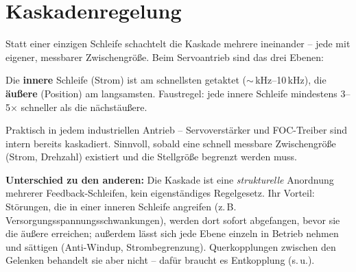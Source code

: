 \section{Kaskadenregelung}
Statt einer einzigen Schleife schachtelt die Kaskade mehrere ineinander -- jede
mit eigener, messbarer Zwischengröße. Beim Servoantrieb sind das drei Ebenen:
\begin{center}
\end{center}
Die \textbf{innere} Schleife (Strom) ist am schnellsten getaktet
($\sim$\,kHz--10\,kHz), die \textbf{äußere} (Position) am langsamsten. Faustregel:
jede innere Schleife mindestens 3--5$\times$ schneller als die nächstäußere.
\begin{infobox}[title=Wann einsetzen]
Praktisch in jedem industriellen Antrieb -- Servoverstärker und FOC-Treiber sind
intern bereits kaskadiert. Sinnvoll, sobald eine schnell messbare Zwischengröße
(Strom, Drehzahl) existiert und die Stellgröße begrenzt werden muss.
\end{infobox}
\textbf{Unterschied zu den anderen:} Die Kaskade ist eine \emph{strukturelle}
Anordnung mehrerer Feedback-Schleifen, kein eigenständiges Regelgesetz. Ihr
Vorteil: Störungen, die in einer inneren Schleife angreifen (z.\,B.
Versorgungsspannungs\-schwankungen), werden dort sofort abgefangen, bevor sie die
äußere erreichen; außerdem lässt sich jede Ebene einzeln in Betrieb nehmen und
sättigen (Anti-Windup, Strombegrenzung). Quer\-kopplungen zwischen den Gelenken
behandelt sie aber nicht -- dafür braucht es Entkopplung (s.\,u.).

